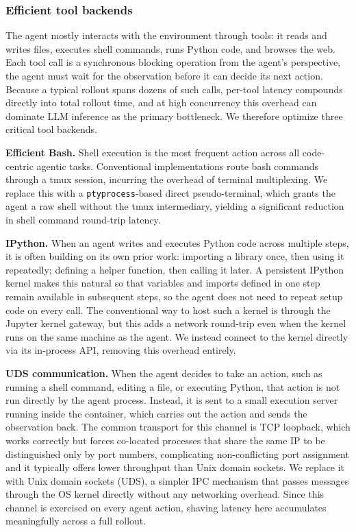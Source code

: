 \subsubsection{Efficient tool backends}
The agent mostly interacts with the environment through tools: it reads and writes files, executes shell commands, runs Python code, and browses the web.
Each tool call is a synchronous blocking operation from the agent's perspective, the agent must wait for the observation before it can decide its next action.
Because a typical rollout spans dozens of such calls, per-tool latency compounds directly into total rollout time, and at high concurrency this overhead can dominate LLM inference as the primary bottleneck.
We therefore optimize three critical tool backends.

\textbf{Efficient Bash.}
Shell execution is the most frequent action across all code-centric agentic tasks. 
Conventional implementations route bash commands through a tmux session, incurring the overhead of terminal multiplexing.
We replace this with a \texttt{ptyprocess}-based direct pseudo-terminal, which grants the agent a raw shell without the tmux intermediary, yielding a significant reduction in shell command round-trip latency.

\textbf{IPython.}
When an agent writes and executes Python code across multiple steps, it is often building on its own prior work: importing a library once, then using it repeatedly; defining a helper function, then calling it later.
A persistent IPython kernel makes this natural so that variables and imports defined in one step remain available in subsequent steps, so the agent does not need to repeat setup code on every call.
The conventional way to host such a kernel is through the Jupyter kernel gateway, but this adds a network round-trip even when the kernel runs on the same machine as the agent.
We instead connect to the kernel directly via its in-process API, removing this overhead entirely. 

\textbf{UDS communication.}
When the agent decides to take an action, such as running a shell command, editing a file, or executing Python, that action is not run directly by the agent process.
Instead, it is sent to a small execution server running inside the container, which carries out the action and sends the observation back.
The common transport for this channel is TCP loopback, which works correctly but forces co-located processes that share the same IP to be distinguished only by port numbers, complicating non-conflicting port assignment and it typically offers lower throughput than Unix domain sockets.
We replace it with Unix domain sockets (UDS), a simpler IPC mechanism that passes messages through the OS kernel directly without any networking overhead. Since this channel is exercised on every agent action, shaving latency here accumulates meaningfully across a full rollout. 

